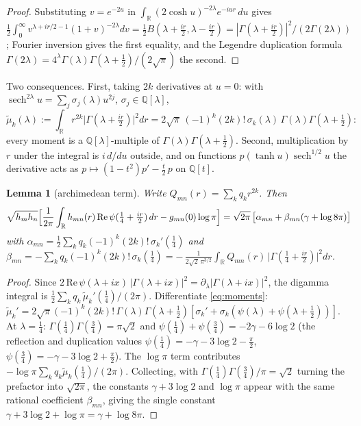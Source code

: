 \documentclass[11pt,a4paper]{article}
\newtheorem{lemma}[theorem]{Lemma}
\theoremstyle{remark}
\newcommand{\R}{\mathbb{R}}
\newcommand{\Q}{\mathbb{Q}}
\newcommand{\G}{\Gamma}
\newcommand{\sech}{\operatorname{sech}}
\begin{document}
\begin{proof}
Substituting $v=e^{-2u}$ in
$\int_\R (2\cosh u)^{-2\lambda}e^{-iur}\,du$ gives
$\tfrac12\int_0^\infty v^{\lambda+ir/2-1}(1+v)^{-2\lambda}dv
=\tfrac12 B(\lambda+\tfrac{ir}2,\lambda-\tfrac{ir}2)
=|\G(\lambda+\tfrac{ir}2)|^2/(2\G(2\lambda))$; Fourier inversion
gives the first equality, and the Legendre duplication formula
$\G(2\lambda)=4^{\lambda}\G(\lambda)\G(\lambda+\tfrac12)/(2\sqrt\pi)$
the second.
\end{proof}

Two consequences.  First, taking $2k$ derivatives at $u=0$: with
$\sech^{2\lambda}u = \sum_j \sigma_j(\lambda)u^{2j}$,
$\sigma_j\in\Q[\lambda]$,
\begin{equation}\label{eq:moments}
\widetilde\mu_k(\lambda)
:= \int_\R r^{2k}\bigl|\G(\lambda+\tfrac{ir}2)\bigr|^2 dr
= 2\sqrt\pi\,(-1)^k(2k)!\,\sigma_k(\lambda)\,
   \G(\lambda)\G(\lambda+\tfrac12):
\end{equation}
every moment is a $\Q[\lambda]$-multiple of
$\G(\lambda)\G(\lambda+\tfrac12)$.  Second, multiplication by $r$
under the integral is $i\,d/du$ outside, and on functions
$p(\tanh u)\sech^{1/2}u$ the derivative acts as
$p \mapsto (1-t^2)p' - \tfrac t2\,p$ on $\Q[t]$.

\begin{lemma}[archimedean term]\label{lem:arch}
Write $Q_{mn}(r)=\sum_k q_k r^{2k}$.  Then
\[
\sqrt{h_mh_n}\Bigl[\frac1{2\pi}\int_\R h_{mn}(r)\,
\mathrm{Re}\,\psi(\tfrac14+\tfrac{ir}2)\,dr - g_{mn}(0)\log\pi\Bigr]
= \sqrt{2\pi}\,\bigl[\alpha_{mn}+\beta_{mn}(\gamma+\log8\pi)\bigr]
\]
with
$\alpha_{mn} = \tfrac12\sum_k q_k(-1)^k(2k)!\,\sigma_k'(\tfrac14)$
and
$\beta_{mn} = -\sum_k q_k(-1)^k(2k)!\,\sigma_k(\tfrac14)
= -\,\frac1{2\sqrt2\,\pi^{3/2}}\int_\R Q_{mn}(r)\,
\bigl|\G(\tfrac14+\tfrac{ir}2)\bigr|^2 dr$.
\end{lemma}

\begin{proof}
Since
$2\,\mathrm{Re}\,\psi(\lambda+ix)\,|\G(\lambda+ix)|^2
=\partial_\lambda|\G(\lambda+ix)|^2$, the digamma integral is
$\tfrac12\sum_k q_k\,\widetilde\mu_k'(\tfrac14)/(2\pi)$.
Differentiate \eqref{eq:moments}:
$\widetilde\mu_k' = 2\sqrt\pi(-1)^k(2k)!\,
\G(\lambda)\G(\lambda+\tfrac12)
[\sigma_k' + \sigma_k(\psi(\lambda)+\psi(\lambda+\tfrac12))]$.
At $\lambda=\tfrac14$: $\G(\tfrac14)\G(\tfrac34)=\pi\sqrt2$ and
$\psi(\tfrac14)+\psi(\tfrac34)=-2\gamma-6\log2$
(the reflection and duplication values
$\psi(\tfrac14)=-\gamma-3\log2-\tfrac\pi2$,
$\psi(\tfrac34)=-\gamma-3\log2+\tfrac\pi2$).  The $\log\pi$ term
contributes $-\log\pi\sum_k q_k\widetilde\mu_k(\tfrac14)/(2\pi)$.
Collecting, with $\G(\tfrac14)\G(\tfrac34)/\pi=\sqrt2$ turning the
prefactor into $\sqrt{2\pi}$, the constants $\gamma+3\log2$ and
$\log\pi$ appear with the same rational coefficient
$\beta_{mn}$, giving the single constant
$\gamma+3\log2+\log\pi=\gamma+\log8\pi$.
\end{proof}
\end{document}
